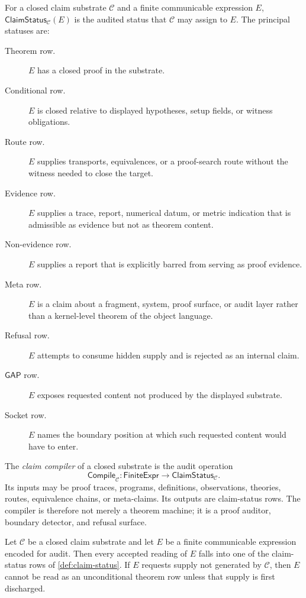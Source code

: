 \begin{definition}
\label{def:claim-status}
For a closed claim substrate $\mathcal C$ and a finite communicable
expression $E$, $\mathsf{ClaimStatus}_{\mathcal C}(E)$ is the audited status
that $\mathcal C$ may assign to $E$.  The principal statuses are:
\begin{description}
\item[Theorem row.] $E$ has a closed proof in the substrate.
\item[Conditional row.] $E$ is closed relative to displayed hypotheses,
  setup fields, or witness obligations.
\item[Route row.] $E$ supplies transports, equivalences, or a proof-search
  route without the witness needed to close the target.
\item[Evidence row.] $E$ supplies a trace, report, numerical datum, or metric
  indication that is admissible as evidence but not as theorem content.
\item[Non-evidence row.] $E$ supplies a report that is explicitly barred from
  serving as proof evidence.
\item[Meta row.] $E$ is a claim about a fragment, system, proof surface, or
  audit layer rather than a kernel-level theorem of the object language.
\item[Refusal row.] $E$ attempts to consume hidden supply and is rejected as
  an internal claim.
\item[$\mathsf{GAP}$ row.] $E$ exposes requested content not produced by the
  displayed substrate.
\item[Socket row.] $E$ names the boundary position at which such requested
  content would have to enter.
\end{description}
\end{definition}

\begin{definition}
\label{def:claim-compiler}
The \emph{claim compiler} of a closed substrate is the audit operation
$$
\mathsf{Compile}_{\mathcal C}
  : \mathsf{FiniteExpr}
  \longrightarrow
  \mathsf{ClaimStatus}_{\mathcal C}.
$$
Its inputs may be proof traces, programs, definitions, observations,
theories, routes, equivalence chains, or meta-claims.  Its outputs are
claim-status rows.  The compiler is therefore not merely a theorem machine;
it is a proof auditor, boundary detector, and refusal surface.
\end{definition}

\begin{theorem}
\label{thm:claim-status-exhaustion}
Let $\mathcal C$ be a closed claim substrate and let $E$ be a finite
communicable expression encoded for audit.  Then every accepted reading of
$E$ falls into one of the claim-status rows of \autoref{def:claim-status}.
If $E$ requests supply not generated by $\mathcal C$, then $E$ cannot be read
as an unconditional theorem row unless that supply is first discharged.
\end{theorem}

